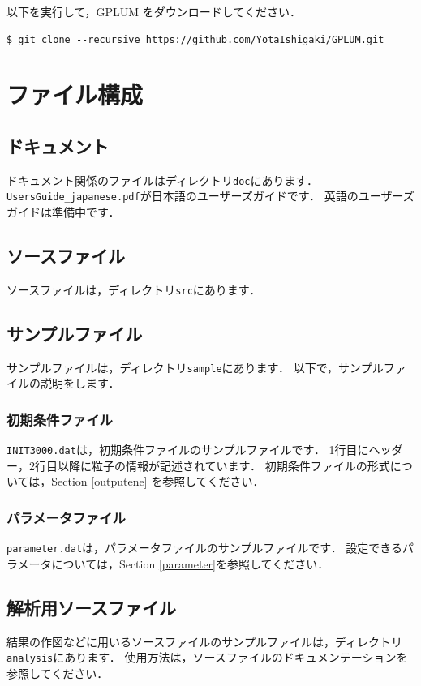 \documentclass[12pt,a4paper,dvipdfmx]{jsarticle}
\newcommand{\ourcode}{GPLUM\xspace}
\begin{document}
以下を実行して，\ourcode をダウンロードしてください．
\begin{verbatim}
$ git clone --recursive https://github.com/YotaIshigaki/GPLUM.git
\end{verbatim}


\section{ファイル構成}

\subsection{ドキュメント}
ドキュメント関係のファイルはディレクトリ\texttt{doc}にあります．
\texttt{UsersGuide\_japanese.pdf}が日本語のユーザーズガイドです．
英語のユーザーズガイドは準備中です．

\subsection{ソースファイル}
ソースファイルは，ディレクトリ\texttt{src}にあります．

\subsection{サンプルファイル}
サンプルファイルは，ディレクトリ\texttt{sample}にあります．
以下で，サンプルファイルの説明をします．
\subsubsection{初期条件ファイル}
\texttt{INIT3000.dat}は，初期条件ファイルのサンプルファイルです．
1行目にヘッダー，2行目以降に粒子の情報が記述されています．
初期条件ファイルの形式については，Section \ref{outputene} を参照してください．

\subsubsection{パラメータファイル}
\texttt{parameter.dat}は，パラメータファイルのサンプルファイルです．
設定できるパラメータについては，Section \ref{parameter}を参照してください．

\subsection{解析用ソースファイル}
結果の作図などに用いるソースファイルのサンプルファイルは，ディレクトリ\texttt{analysis}にあります．
使用方法は，ソースファイルのドキュメンテーションを参照してください．
\end{document}

